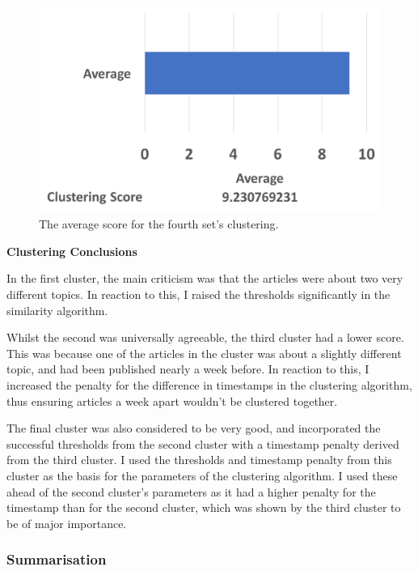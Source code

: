 \documentclass[12pt]{article}
\begin{document}
\begin{figure}[ht!]
  \centering
    \includegraphics[scale=0.6]{cluster4score.png}
   \caption[The average score for a cluster]{The average score for the fourth set's clustering.}
   \label{cluster4}
\end{figure} 

\textbf{Clustering Conclusions}

In the first cluster, the main criticism was that the articles were about two very different topics. In reaction to this, I raised the thresholds significantly in the similarity algorithm. 

Whilst the second was universally agreeable, the third cluster had a lower score. This was because one of the articles in the cluster was about a slightly different topic, and had been published nearly a week before. In reaction to this, I increased the penalty for the difference in timestamps in the clustering algorithm, thus ensuring articles a week apart wouldn't be clustered together.

The final cluster was also considered to be very good, and incorporated the successful thresholds from the second cluster with a timestamp penalty derived from the third cluster. I used the thresholds and timestamp penalty from this cluster as the basis for the parameters of the clustering algorithm. I used these ahead of the second cluster's parameters as it had a higher penalty for the timestamp than for the second cluster, which was shown by the third cluster to be of major importance.

\subsubsection{Summarisation}
\end{document}
